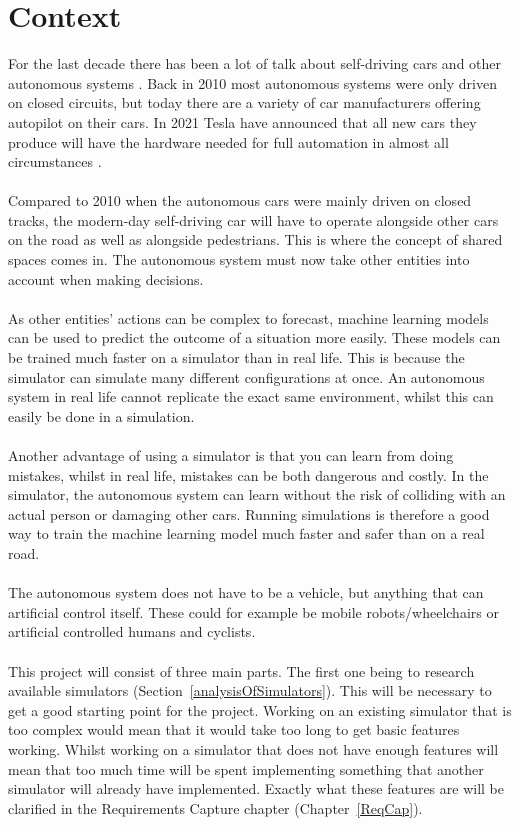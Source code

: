 \newcommand\tab[1][1cm]{\hspace*{#1}}

\section{Context}
For the last decade there has been a lot of talk about self-driving cars and other autonomous systems \cite{markoff_2010}. Back in 2010 most autonomous systems were only driven on closed circuits, but today there are a variety of car manufacturers offering autopilot on their cars. In 2021 Tesla have announced that all new cars they produce will have the hardware needed for full automation in almost all circumstances \cite{teslaSelf}. 
\\~\\ 
Compared to 2010 when the autonomous cars were mainly driven on closed tracks, the modern-day self-driving car will have to operate alongside other cars on the road as well as alongside pedestrians.  This is where the concept of shared spaces comes in. The autonomous system must now take other entities into account when making decisions. 
\\~\\ 
As other entities’ actions can be complex to forecast, machine learning models can be used to predict the outcome of a situation more easily. These models can be trained much faster on a simulator than in real life. This is because the simulator can simulate many different configurations at once. An autonomous system in real life cannot replicate the exact same environment, whilst this can easily be done in a simulation.  
\\~\\ 
Another advantage of using a simulator is that you can learn from doing mistakes, whilst in real life, mistakes can be both dangerous and costly. In the simulator, the autonomous system can learn without the risk of colliding with an actual person or damaging other cars. Running simulations is therefore a good way to train the machine learning model much faster and safer than on a real road.  
\\~\\ 
The autonomous system does not have to be a vehicle, but anything that can artificial control itself. These could for example be mobile robots/wheelchairs or artificial controlled humans and cyclists. 
\\~\\ 
This project will consist of three main parts. The first one being to research available simulators (Section~\ref{analysisOfSimulators}). This will be necessary to get a good starting point for the project. Working on an existing simulator that is too complex would mean that it would take too long to get basic features working. Whilst working on a simulator that does not have enough features will mean that too much time will be spent implementing something that another simulator will already have implemented. Exactly what these features are will be clarified in the Requirements Capture chapter (Chapter~\ref{ReqCap}). 
